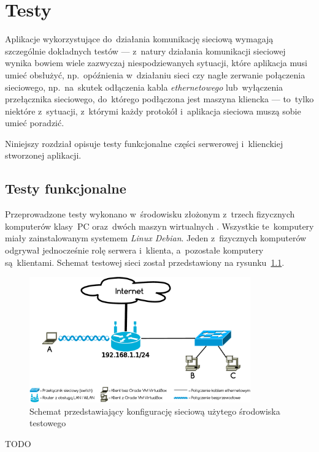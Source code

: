 \documentclass[thesis]{subfiles}
\begin{document}
\chapter{Testy}

Aplikacje wykorzystujące do~działania komunikację sieciową wymagają szczególnie dokładnych testów --- z~natury działania komunikacji sieciowej wynika bowiem wiele zazwyczaj niespodziewanych sytuacji, które aplikacja musi umieć obsłużyć, np.~opóźnienia w~działaniu sieci czy nagłe zerwanie połączenia sieciowego, np.~na~skutek odłączenia kabla \emph{ethernetowego} lub~wyłączenia przełącznika sieciowego, do~którego podłączona jest maszyna kliencka --- to~tylko niektóre z~sytuacji, z~którymi każdy protokół i~aplikacja sieciowa muszą sobie umieć poradzić.

Niniejszy rozdział opisuje testy funkcjonalne części serwerowej i~klienckiej stworzonej aplikacji.

%
%
%

\section{Testy funkcjonalne}

Przeprowadzone testy wykonano w~środowisku złożonym z~trzech fizycznych komputerów klasy~PC oraz~dwóch maszyn wirtualnych . Wszystkie te~komputery miały zainstalowanym systemem \emph{Linux Debian}. Jeden z~fizycznych komputerów odgrywał jednocześnie rolę serwera i~klienta, a~pozostałe komputery są~klientami. Schemat testowej sieci został przedstawiony na rysunku~\ref{fig:testing-network}.

\begin{figure}
	\centering
	\includegraphics[width=0.85\textwidth]{img/testing-network}
	\caption{Schemat przedstawiający konfigurację sieciową użytego środowiska testowego}
	\label{fig:testing-network}
\end{figure}

TODO
\end{document}
